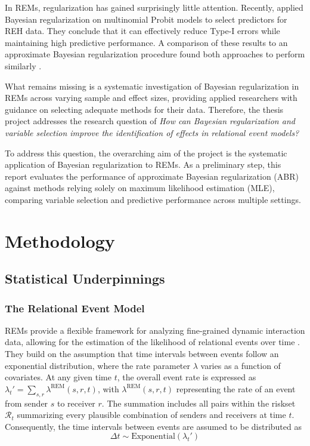 \documentclass{article}
\begin{document}
\begin{spacing}{2}
\begin{justify}
In REMs, regularization has gained surprisingly little attention. Recently, \citet{Karimova2023} applied Bayesian regularization on multinomial Probit models to select predictors for REH data.  They conclude that it can effectively reduce Type-I errors while maintaining high predictive performance. A comparison of these results to an approximate Bayesian regularization procedure found both approaches to perform similarly \citep{Karimova2024}.\par

What remains missing is a systematic investigation of Bayesian regularization in REMs across varying sample and effect sizes, providing applied researchers with guidance on selecting adequate methods for their data. Therefore, the thesis project addresses the research question of \textit{How can Bayesian regularization and variable selection improve the identification of effects in relational event models?}

To address this question, the overarching aim of the project is the systematic application of Bayesian regularization to REMs. As a preliminary step, this report evaluates the performance of approximate Bayesian regularization (ABR) against methods relying solely on maximum likelihood estimation (MLE), comparing variable selection and predictive performance across multiple settings.

\section{Methodology}

\subsection{Statistical Underpinnings}

\subsubsection{The Relational Event Model}

REMs provide a flexible framework for analyzing fine-grained dynamic interaction data, allowing for the estimation of the likelihood of relational events over time \citep{Butts2008}. They build on the assumption that time intervals between events follow an exponential distribution, where the rate parameter $\lambda$ varies as a function of covariates. At any given time $t$, the overall event rate is expressed as $\lambda_t' = \sum_{s,r} \lambda^{\text{REM}}(s,r,t)$, with $\lambda^{\text{REM}}(s,r,t)$ representing the rate of an event from sender $s$ to receiver $r$. The summation includes all pairs within the riskset $\mathcal{R}_t$ summarizing every plausible combination of senders and receivers at time $t$. Consequently, the time intervals between events are assumed to be distributed as
\begin{equation}
    \Delta t \sim \text{Exponential}(\lambda_t') \label{eq:rem_exp}
\end{equation}


\end{justify}
\end{spacing}
\end{document}
